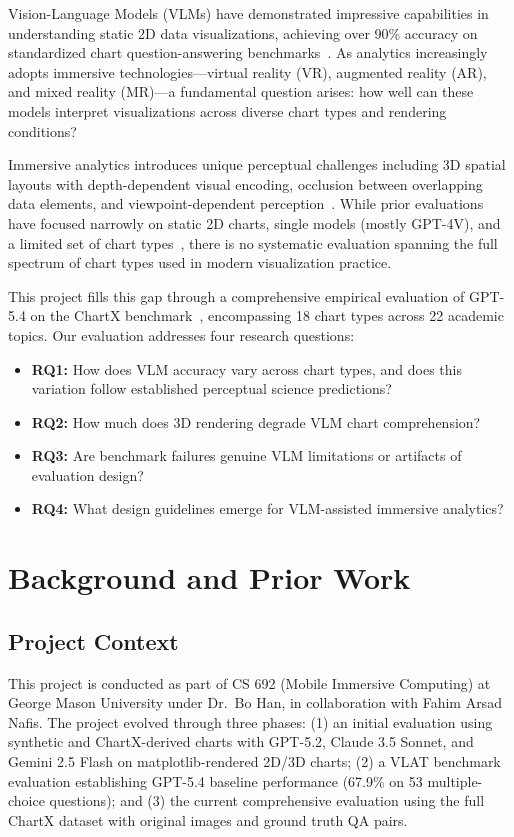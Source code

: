 \documentclass[sigconf, 10pt]{acmart}
\begin{document}
Vision-Language Models (VLMs) have demonstrated impressive capabilities in understanding static 2D data visualizations, achieving over 90\% accuracy on standardized chart question-answering benchmarks~\cite{chartqa}. As analytics increasingly adopts immersive technologies---virtual reality (VR), augmented reality (AR), and mixed reality (MR)---a fundamental question arises: how well can these models interpret visualizations across diverse chart types and rendering conditions?

Immersive analytics introduces unique perceptual challenges including 3D spatial layouts with depth-dependent visual encoding, occlusion between overlapping data elements, and viewpoint-dependent perception~\cite{marriott2018}. While prior evaluations have focused narrowly on static 2D charts, single models (mostly GPT-4V), and a limited set of chart types~\cite{kim2024,wu2024}, there is no systematic evaluation spanning the full spectrum of chart types used in modern visualization practice.

This project fills this gap through a comprehensive empirical evaluation of GPT-5.4 on the ChartX benchmark~\cite{chartx}, encompassing 18 chart types across 22 academic topics. Our evaluation addresses four research questions:
\begin{itemize}
    \item \textbf{RQ1:} How does VLM accuracy vary across chart types, and does this variation follow established perceptual science predictions?
    \item \textbf{RQ2:} How much does 3D rendering degrade VLM chart comprehension?
    \item \textbf{RQ3:} Are benchmark failures genuine VLM limitations or artifacts of evaluation design?
    \item \textbf{RQ4:} What design guidelines emerge for VLM-assisted immersive analytics?
\end{itemize}

\section{Background and Prior Work}

\subsection{Project Context}
This project is conducted as part of CS 692 (Mobile Immersive Computing) at George Mason University under Dr.\ Bo Han, in collaboration with Fahim Arsad Nafis. The project evolved through three phases: (1) an initial evaluation using synthetic and ChartX-derived charts with GPT-5.2, Claude 3.5 Sonnet, and Gemini 2.5 Flash on matplotlib-rendered 2D/3D charts; (2) a VLAT benchmark evaluation establishing GPT-5.4 baseline performance (67.9\% on 53 multiple-choice questions); and (3) the current comprehensive evaluation using the full ChartX dataset with original images and ground truth QA pairs.
\end{document}
